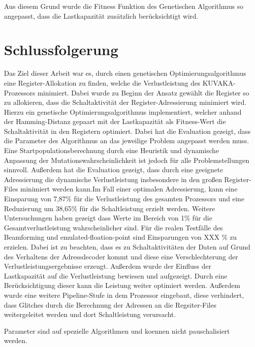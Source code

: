 Aus diesem Grund wurde die Fitness Funktion des Genetischen Algorithmus so angepasst, dass die Lastkapazität zusätzlich berücksichtigt wird.

\section{Schlussfolgerung}
\label{sec:Schlussfolgerung}
Das Ziel dieser Arbeit war es, durch einen genetischen Optimierungsalgorithmus eine Register-Allokation zu finden, welche die Verlustleistung des KUVAKA-Prozessors minimiert. Dabei wurde zu Beginn der Ansatz gewählt die Register so zu allokieren, dass die Schaltaktivität der Register-Adressierung minimiert wird. Hierzu ein genetische Optimierungsalgorithmus implementiert, welcher anhand der Hamming-Distanz gepaart mit der Lastkapazität als Fitness-Wert die Schaltaktivität in den Registern optimiert. Dabei hat die Evaluation gezeigt, dass die Parameter des Algorithmus an das jeweilige Problem angepasst werden muss. Eine Startpopulationsberechnung durch eine Heuristik und dynamische Anpassung der Mutationswahrscheinlichkeit ist jedoch für alle Problemstellungen sinnvoll.
Außerdem hat die Evaluation gezeigt, dass durch eine geeignete Adressierung die dynamische Verlustleistung insbesondere in den großen Register-Files minimiert werden kann.Im Fall einer optimalen Adressierung, kann eine Einsparung von 7,87\% für die Verlustleistung des gesamten Prozessors und eine Reduzierung um 38,65\% für die Schaltleistung erzielt werden. Weitere Untersuchungen haben gezeigt dass Werte im Bereich von 1\% für die Gesamtverlustleistung wahrscheinlicher sind. Für die realen Testfälle des Beamforming und emulated-floation-point sind Einsparungen von XXX \% zu erzielen. Dabei ist zu beachten, dass es zu Schaltaktivitäten der Daten auf Grund des Verhaltens der Adressdecoder kommt und diese eine Verschlechterung der Verlustleistungsergebnisse erzeugt. Außerdem wurde der Einfluss der Lastkapazität auf die Verlustleistung bewiesen und aufgezeigt. Durch eine Berücksichtigung dieser kann die Leistung weiter optimiert werden.
Außerdem wurde eine weitere Pipeline-Stufe in dem Prozessor eingebaut, diese verhindert, dass Glitches durch die Berechnung der Adressen an die Regsiter-Files weitergeleitet werden und dort Schaltleistung verursacht.


 



Parameter sind auf spezielle Algorithmen und koennen nicht pauschalisiert werden.
